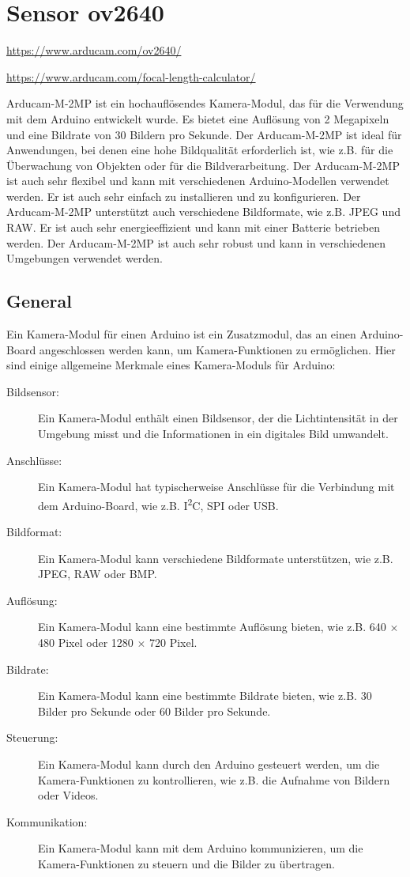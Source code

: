 %
%
%

\chapter{Sensor ov2640}

\url{https://www.arducam.com/ov2640/}

\url{https://www.arducam.com/focal-length-calculator/}

Arducam-M-2MP ist ein hochauflösendes Kamera-Modul, das für die Verwendung mit dem Arduino entwickelt wurde. Es bietet eine Auflösung von 2 Megapixeln und eine Bildrate von 30 Bildern pro Sekunde. Der Arducam-M-2MP ist ideal für Anwendungen, bei denen eine hohe Bildqualität erforderlich ist, wie z.B. für die Überwachung von Objekten oder für die Bildverarbeitung. Der Arducam-M-2MP ist auch sehr flexibel und kann mit verschiedenen Arduino-Modellen verwendet werden. Er ist auch sehr einfach zu installieren und zu konfigurieren. Der Arducam-M-2MP unterstützt auch verschiedene Bildformate, wie z.B. JPEG und RAW. Er ist auch sehr energieeffizient und kann mit einer Batterie betrieben werden. Der Arducam-M-2MP ist auch sehr robust und kann in verschiedenen Umgebungen verwendet werden.

\section{General}

Ein Kamera-Modul für einen Arduino ist ein Zusatzmodul, das an einen Arduino-Board angeschlossen werden kann, um Kamera-Funktionen zu ermöglichen. Hier sind einige allgemeine Merkmale eines Kamera-Moduls für Arduino:

\begin{description}
  \item [Bildsensor:] Ein Kamera-Modul enthält einen Bildsensor, der die Lichtintensität in der Umgebung misst und die Informationen in ein digitales Bild umwandelt.
  \item [Anschlüsse:] Ein Kamera-Modul hat typischerweise Anschlüsse für die Verbindung mit dem Arduino-Board, wie z.B. I\textsuperscript{2}C, SPI oder USB.
  \item [Bildformat:] Ein Kamera-Modul kann verschiedene Bildformate unterstützen, wie z.B. JPEG, RAW oder BMP.
  \item [Auflösung:] Ein Kamera-Modul kann eine bestimmte Auflösung bieten, wie z.B. 640 $\times$ 480 Pixel oder 1280 $\times$ 720 Pixel.
  \item [Bildrate:] Ein Kamera-Modul kann eine bestimmte Bildrate bieten, wie z.B. 30 Bilder pro Sekunde oder 60 Bilder pro Sekunde.
  \item [Steuerung:] Ein Kamera-Modul kann durch den Arduino gesteuert werden, um die Kamera-Funktionen zu kontrollieren, wie z.B. die Aufnahme von Bildern oder Videos.
  \item [Kommunikation:] Ein Kamera-Modul kann mit dem Arduino kommunizieren, um die Kamera-Funktionen zu steuern und die Bilder zu übertragen.
\end{description}

